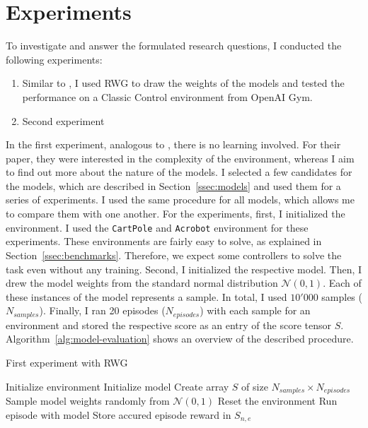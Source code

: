 \section{Experiments}
To investigate and answer the formulated research questions, I conducted the following experiments:
\begin{enumerate}
  \item Similar to \citet{oller_analyzing_2020}, I used RWG to draw the weights of the models and tested the performance on a Classic Control environment from OpenAI Gym.
  \item Second experiment
\end{enumerate}
In the first experiment, analogous to \citet{oller_analyzing_2020}, there is no learning involved. For their paper, they were interested in the complexity of the environment, whereas I aim to find out more about the nature of the models. I selected a few candidates for the models, which are described in Section~\ref{ssec:models} and used them for a series of experiments. I used the same procedure for all models, which allows me to compare them with one another. For the experiments, first, I initialized the environment. I used the \verb|CartPole| and \verb|Acrobot| environment for these experiments. These environments are fairly easy to solve, as explained in Section~\ref{ssec:benchmarks}. Therefore, we expect some controllers to solve the task even without any training. Second, I initialized the respective model. Then, I drew the model weights from the standard normal distribution $\mathcal{N}(0,1)$. Each of these instances of the model represents a sample. In total, I used $10'000$ samples ($N_{samples}$). Finally, I ran 20 episodes ($N_{episodes}$) with each sample for an environment and stored the respective score as an entry of the score tensor $S$. Algorithm~\ref{alg:model-evaluation} shows an overview of the described procedure.
\begin{algorithm}
\caption{First experiment with RWG}
\begin{algorithmic}[1]
\State Initialize environment
\State Initialize model
\State Create array $S$ of size $N_{samples} \times N_{episodes}$
    \State Sample model weights randomly from $\mathcal{N}(0,1)$
      \State Reset the environment
      \State Run episode with model
      \State Store accured episode reward in $S_{n,e}$
    \EndFor
\EndFor
\end{algorithmic}
\label{alg:model-evaluation}
\end{algorithm}

